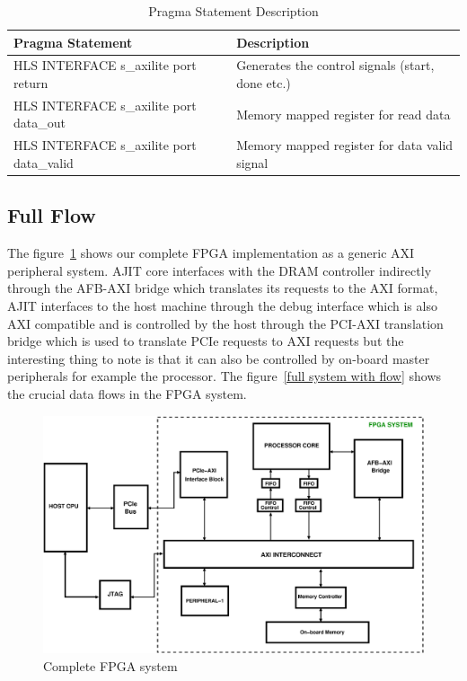 \normalsize
\doublespacing

\begin{table}[H]
\begin{tabular}{| l | l |}
\hline
Pragma Statement & Description\\
\hline
HLS INTERFACE s\_axilite port return & Generates the control signals (start, done etc.)\\
HLS INTERFACE s\_axilite port data\_out & Memory mapped register for read data\\
HLS INTERFACE s\_axilite port data\_valid & Memory mapped register for data valid signal\\
\hline
\end{tabular}
\caption{Pragma Statement Description}
\label{pragma description}
\end{table}

\subsection{Full Flow}

The figure~\ref{full system} shows our complete FPGA implementation as a generic AXI peripheral system. AJIT core interfaces with the DRAM controller
indirectly through the AFB-AXI bridge which translates its requests to the AXI format, AJIT interfaces to the host machine through the debug
interface which is also AXI compatible and is controlled by the host through the PCI-AXI translation bridge which is used to translate PCIe requests to AXI
requests but the interesting thing to note is that it can also be controlled by on-board master peripherals for example the processor. The
figure~\ref{full system with flow} shows the crucial data flows in the FPGA system.

\begin{figure}[H]
\centering
\includegraphics[width=\textwidth]{eps_pdf_sources/ajit_fpga/Full_System/Full_system}
\caption{Complete FPGA system}
\label{full system}
\end{figure}

